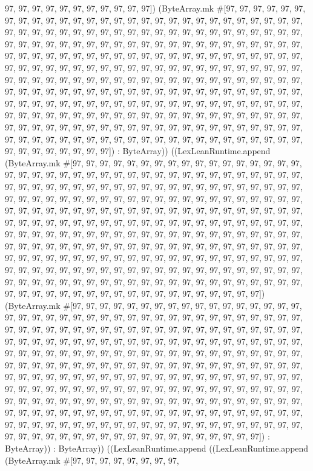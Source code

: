 \documentclass[11pt]{article}
\begin{document}
97, 97, 97, 97, 97, 97, 97, 97, 97, 97, 97]) (ByteArray.mk \#[97, 97, 97, 97, 97, 97, 97, 97, 97, 97, 97, 97, 97, 97, 97, 97, 97, 97, 97, 97, 97, 97, 97, 97, 97, 97, 97, 97, 97, 97, 97, 97, 97, 97, 97, 97, 97, 97, 97, 97, 97, 97, 97, 97, 97, 97, 97, 97, 97, 97, 97, 97, 97, 97, 97, 97, 97, 97, 97, 97, 97, 97, 97, 97, 97, 97, 97, 97, 97, 97, 97, 97, 97, 97, 97, 97, 97, 97, 97, 97, 97, 97, 97, 97, 97, 97, 97, 97, 97, 97, 97, 97, 97, 97, 97, 97, 97, 97, 97, 97, 97, 97, 97, 97, 97, 97, 97, 97, 97, 97, 97, 97, 97, 97, 97, 97, 97, 97, 97, 97, 97, 97, 97, 97, 97, 97, 97, 97, 97, 97, 97, 97, 97, 97, 97, 97, 97, 97, 97, 97, 97, 97, 97, 97, 97, 97, 97, 97, 97, 97, 97, 97, 97, 97, 97, 97, 97, 97, 97, 97, 97, 97, 97, 97, 97, 97, 97, 97, 97, 97, 97, 97, 97, 97, 97, 97, 97, 97, 97, 97, 97, 97, 97, 97, 97, 97, 97, 97, 97, 97, 97, 97, 97, 97, 97, 97, 97, 97, 97, 97, 97, 97, 97, 97, 97, 97, 97, 97, 97, 97, 97, 97, 97, 97, 97, 97, 97, 97, 97, 97, 97, 97, 97, 97, 97, 97, 97, 97, 97, 97, 97, 97, 97, 97, 97, 97, 97, 97, 97, 97, 97, 97, 97, 97, 97, 97, 97, 97, 97, 97, 97, 97, 97, 97, 97, 97]) : ByteArray)) ((LexLeanRuntime.append (ByteArray.mk \#[97, 97, 97, 97, 97, 97, 97, 97, 97, 97, 97, 97, 97, 97, 97, 97, 97, 97, 97, 97, 97, 97, 97, 97, 97, 97, 97, 97, 97, 97, 97, 97, 97, 97, 97, 97, 97, 97, 97, 97, 97, 97, 97, 97, 97, 97, 97, 97, 97, 97, 97, 97, 97, 97, 97, 97, 97, 97, 97, 97, 97, 97, 97, 97, 97, 97, 97, 97, 97, 97, 97, 97, 97, 97, 97, 97, 97, 97, 97, 97, 97, 97, 97, 97, 97, 97, 97, 97, 97, 97, 97, 97, 97, 97, 97, 97, 97, 97, 97, 97, 97, 97, 97, 97, 97, 97, 97, 97, 97, 97, 97, 97, 97, 97, 97, 97, 97, 97, 97, 97, 97, 97, 97, 97, 97, 97, 97, 97, 97, 97, 97, 97, 97, 97, 97, 97, 97, 97, 97, 97, 97, 97, 97, 97, 97, 97, 97, 97, 97, 97, 97, 97, 97, 97, 97, 97, 97, 97, 97, 97, 97, 97, 97, 97, 97, 97, 97, 97, 97, 97, 97, 97, 97, 97, 97, 97, 97, 97, 97, 97, 97, 97, 97, 97, 97, 97, 97, 97, 97, 97, 97, 97, 97, 97, 97, 97, 97, 97, 97, 97, 97, 97, 97, 97, 97, 97, 97, 97, 97, 97, 97, 97, 97, 97, 97, 97, 97, 97, 97, 97, 97, 97, 97, 97, 97, 97, 97, 97, 97, 97, 97, 97, 97, 97, 97, 97, 97, 97, 97, 97, 97, 97, 97, 97, 97, 97, 97, 97, 97, 97, 97, 97, 97, 97, 97, 97]) (ByteArray.mk \#[97, 97, 97, 97, 97, 97, 97, 97, 97, 97, 97, 97, 97, 97, 97, 97, 97, 97, 97, 97, 97, 97, 97, 97, 97, 97, 97, 97, 97, 97, 97, 97, 97, 97, 97, 97, 97, 97, 97, 97, 97, 97, 97, 97, 97, 97, 97, 97, 97, 97, 97, 97, 97, 97, 97, 97, 97, 97, 97, 97, 97, 97, 97, 97, 97, 97, 97, 97, 97, 97, 97, 97, 97, 97, 97, 97, 97, 97, 97, 97, 97, 97, 97, 97, 97, 97, 97, 97, 97, 97, 97, 97, 97, 97, 97, 97, 97, 97, 97, 97, 97, 97, 97, 97, 97, 97, 97, 97, 97, 97, 97, 97, 97, 97, 97, 97, 97, 97, 97, 97, 97, 97, 97, 97, 97, 97, 97, 97, 97, 97, 97, 97, 97, 97, 97, 97, 97, 97, 97, 97, 97, 97, 97, 97, 97, 97, 97, 97, 97, 97, 97, 97, 97, 97, 97, 97, 97, 97, 97, 97, 97, 97, 97, 97, 97, 97, 97, 97, 97, 97, 97, 97, 97, 97, 97, 97, 97, 97, 97, 97, 97, 97, 97, 97, 97, 97, 97, 97, 97, 97, 97, 97, 97, 97, 97, 97, 97, 97, 97, 97, 97, 97, 97, 97, 97, 97, 97, 97, 97, 97, 97, 97, 97, 97, 97, 97, 97, 97, 97, 97, 97, 97, 97, 97, 97, 97, 97, 97, 97, 97, 97, 97, 97, 97, 97, 97, 97, 97, 97, 97, 97, 97, 97, 97, 97, 97, 97, 97, 97, 97, 97, 97, 97, 97, 97, 97]) : ByteArray)) : ByteArray)) ((LexLeanRuntime.append ((LexLeanRuntime.append (ByteArray.mk \#[97, 97, 97, 97, 97, 97, 97, 97, 
\end{document}
